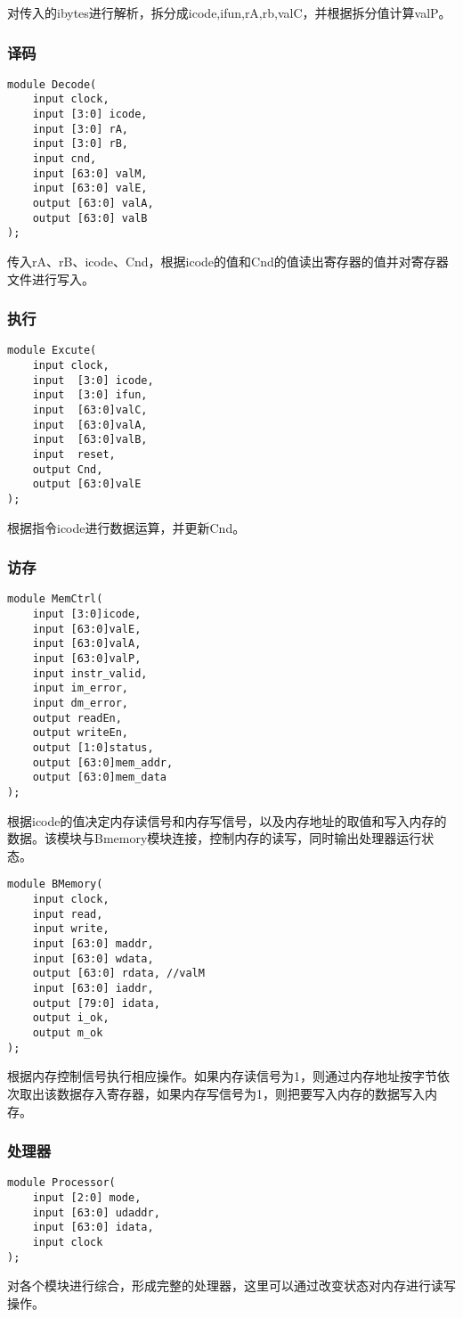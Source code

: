 对传入的ibytes进行解析，拆分成icode,ifun,rA,rb,valC，并根据拆分值计算valP。


\subsubsection{译码}
\begin{verbatim}
module Decode(
    input clock,
    input [3:0] icode,
    input [3:0] rA,
    input [3:0] rB,
    input cnd,
    input [63:0] valM,
    input [63:0] valE,
    output [63:0] valA,
    output [63:0] valB
);
\end{verbatim}

传入rA、rB、icode、Cnd，根据icode的值和Cnd的值读出寄存器的值并对寄存器文件进行写入。

\subsubsection{执行}
\begin{verbatim}
module Excute(
    input clock,
    input  [3:0] icode,
    input  [3:0] ifun,
    input  [63:0]valC,
    input  [63:0]valA,
    input  [63:0]valB,
    input  reset,
    output Cnd,
    output [63:0]valE
);
\end{verbatim}

根据指令icode进行数据运算，并更新Cnd。

\subsubsection{访存}
\begin{verbatim}
module MemCtrl(
    input [3:0]icode,
    input [63:0]valE,
    input [63:0]valA,
    input [63:0]valP,
    input instr_valid,
    input im_error,
    input dm_error,
    output readEn,
    output writeEn,
    output [1:0]status,
    output [63:0]mem_addr,
    output [63:0]mem_data
);
\end{verbatim}

根据icode的值决定内存读信号和内存写信号，以及内存地址的取值和写入内存的数据。该模块与Bmemory模块连接，控制内存的读写，同时输出处理器运行状态。

\begin{verbatim}
module BMemory(
    input clock,
    input read,
    input write,
    input [63:0] maddr,
    input [63:0] wdata,
    output [63:0] rdata, //valM
    input [63:0] iaddr,
    output [79:0] idata,
    output i_ok,
    output m_ok
);
\end{verbatim}

根据内存控制信号执行相应操作。如果内存读信号为1，则通过内存地址按字节依次取出该数据存入寄存器，如果内存写信号为1，则把要写入内存的数据写入内存。

\subsubsection{处理器}
\begin{verbatim}
module Processor(
    input [2:0] mode,
    input [63:0] udaddr,
    input [63:0] idata,
    input clock
);
\end{verbatim}

对各个模块进行综合，形成完整的处理器，这里可以通过改变状态对内存进行读写操作。
